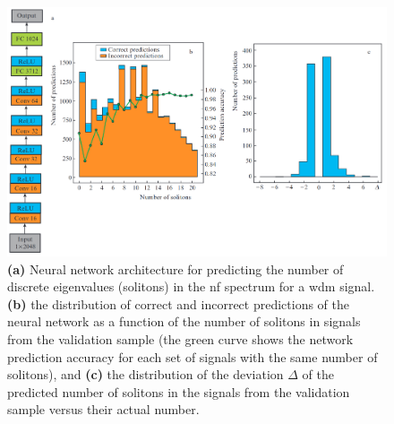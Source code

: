 \begin{figure}
    \centering
    \includegraphics[width=1.0\linewidth]{images/nn_discrete/discrete_result.png}
    \caption{\textbf{(a)} Neural network architecture for predicting the number of discrete eigenvalues (solitons) in the \acrlong{nf} spectrum for a \acrshort{wdm} signal. \textbf{(b)} the distribution of correct and incorrect predictions of the neural network as a function of the number of solitons in signals from the validation sample (the green curve shows the network prediction accuracy for each set of signals with the same number of solitons), and \textbf{(c)} the distribution of the deviation $\Delta$ of the predicted number of solitons in the signals from the validation sample versus their actual
number.}
    \label{fig:nn_discrete_result}
\end{figure}

